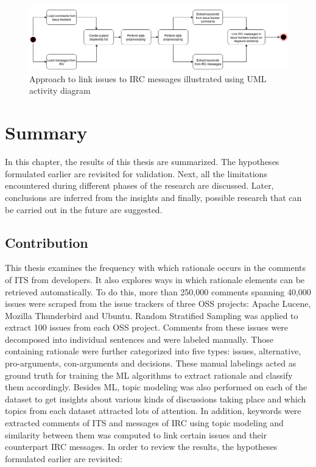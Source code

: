 \documentclass[a4paper,12pt,twoside]{report}
\begin{document}
\begin{figure}[h] %
    \centering
    \includegraphics[width=14cm]{topic-linking}
    \caption{Approach to link issues to IRC messages illustrated using UML activity diagram}
    \label{fig:topiclinkingClass}
\end{figure}


\chapter{Summary}
In this chapter, the results of this thesis are summarized. The hypotheses formulated earlier are revisited for validation. Next, all the limitations encountered during different phases of the research are discussed. Later, conclusions are inferred from the insights and finally, possible research that can be carried out in the future are suggested.

\section{Contribution}
This thesis examines the frequency with which rationale occurs in the comments of ITS from developers. It also explores ways in which rationale elements can be retrieved automatically. To do this, more than 250,000 comments spanning 40,000 issues were scraped from the issue trackers of three OSS projects: Apache Lucene, Mozilla Thunderbird and Ubuntu. Random Stratified Sampling was applied to extract 100 issues from each OSS project. Comments from these issues were decomposed into individual sentences and were labeled manually. Those containing rationale were further categorized into five types: issues, alternative, pro-arguments, con-arguments and decisions. These manual labelings acted as ground truth for training the ML algorithms to extract rationale and classify them accordingly. 
\bigbreak
Besides ML, topic modeling was also performed on each of the dataset to get insights about various kinds of discussions taking place and which topics from each dataset attracted lots of attention. In addition, keywords were extracted comments of ITS and messages of IRC using topic modeling and similarity between them was computed to link certain issues and their counterpart IRC messages. In order to review the results, the hypotheses formulated earlier are revisited:
\end{document}
